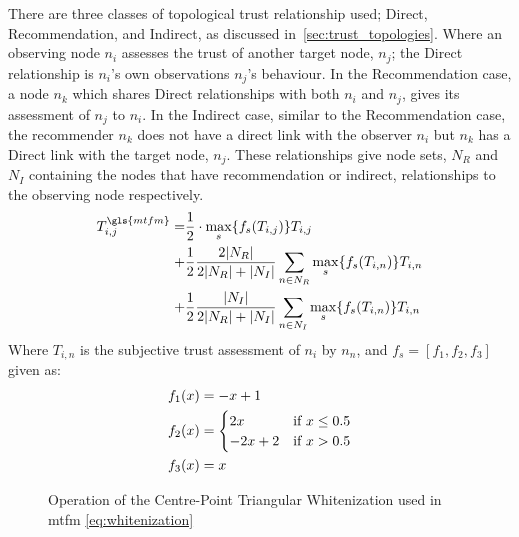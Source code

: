 There are three classes of topological trust relationship used; Direct, Recommendation, and Indirect, as discussed in~\autoref{sec:trust_topologies}.
Where an observing node $n_i$ assesses the trust of another target node, $n_j$; the Direct relationship is $n_i$'s own observations $n_j$'s behaviour.
In the Recommendation case, a node $n_k$ which shares Direct relationships with both $n_i$ and $n_j$, gives its assessment of $n_j$ to $n_i$.
In the Indirect case, similar to the Recommendation case, the recommender $n_k$ does not have a direct link with the observer $n_i$ but $n_k$ has a Direct link with the target node, $n_j$.
These relationships give node sets, $N_R$ and $N_I$ containing the nodes that have recommendation or indirect, relationships to the observing node respectively.
%
\begin{align}
  \label{eq:networkeffects}
  T_{i,j}^{\gls{mtfm}}=&\frac{1}{2} \cdot \max_s\{f_s(T_{i,j})\} T_{i,j}\\ \notag
  +&\frac{1}{2} \frac{2|N_R| }{2|N_R| + |N_I|}\sum_{n \in N_R} \max_s\{f_s(T_{i,n})\} T_{i,n}\\ \notag
  +&\frac{1}{2} \frac{|N_I| }{2|N_R| + |N_I|}\sum_{n \in N_I} \max_s\{f_s(T_{i,n})\} T_{i,n} 
\end{align}
Where $T_{i,n}$ is the subjective trust assessment of $n_i$ by $n_n$, and $f_s = [ f_1,f_2, f_3]$ given as:
\begin{align}
  \label{eq:whitenization}
  f_1(x)&= -x+1\notag\\
  f_2(x)&= 
  \begin{cases}
    2x & \text{if }x\leq 0.5\\
    -2x+2 & \text{if }x>0.5
  \end{cases}\\
  f_3(x)&= x\notag
\end{align}
%

\begin{figure}
	\centering
	\caption{Operation of the Centre-Point Triangular Whitenization used in \gls{mtfm} \autoref{eq:whitenization}}
	\label{fig:whitenization}
\end{figure}

